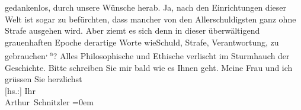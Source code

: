 \begin{ledgroupsized}[t]{13cm}
                    gedankenlos, durch unsere Wünsche herab. Ja, nach den Einrichtungen dieser Welt
                    ist sogar zu befürchten, dass mancher von den Allerschuldigsten ganz ohne Strafe
                    ausgehen wird. Aber ziemt es sich \introOben{}denn\introOben{} in dieser
                    überwältigend grauenhaften Epoche derartige Worte \introOben{}wie\introOben{}{ }Schuld, Strafe, Verantwortung,
                    zu gebrauchen\substVorne{}\textsuperscript{, a}\substDazwischen{}? A\substHinten{}lles Philosophische und Ethische verlischt im Sturmhauch der
                    Geschichte.\pend
           \pstart
           Bitte schreiben Sie mir bald wie es Ihnen geht. Meine Frau und ich grüssen Sie herzlichst{\\[\baselineskip]}{[}hs.:{]} Ihr{\\[\baselineskip]}\spacefill\mbox{Arthur Schnitzler}\pend
           \leftskip=0em{}\endnumbering{}\end{ledgroupsized}  \newcommand{\dateiname}{L02199}\newcommand{\titel}{Arthur Schnitzler an Georg Brandes, 20. 10. 1914}\newcommand{\editorInnen}{Martin Anton Müller und Gerd-Hermann Susen}
      